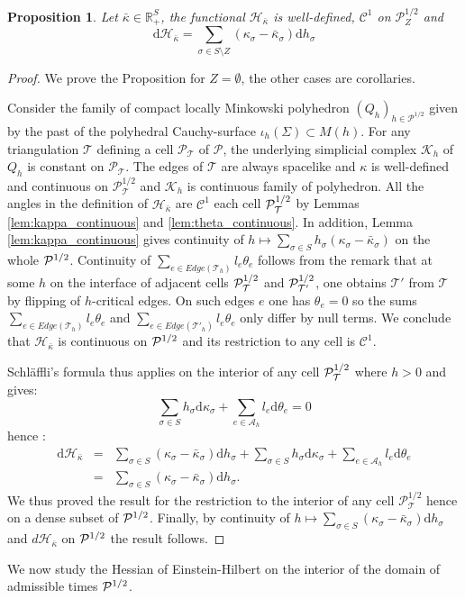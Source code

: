 \documentclass[a4paper,12pt]{article}
\def\A{\mathcal A}
\def\TT{\mathcal T}
\def\adm{\P}
\def\d{\mathrm{d}}
\def\RR{\mathbb{R}}
\def\d{\mathrm{d}}
\def\adm{\mathcal{P}}
\def\P{\mathcal{P}}
\def\A{\mathcal A}
\newtheorem{prop}[lem]{Proposition}
\theoremstyle{definition}
\begin{document}
                    
					\begin{prop} \label{prop:diff_H}
					Let $\bar\kappa \in \RR_+^{S}$, 
					the functional $\mathcal{H}_{\bar \kappa}$ is well-defined, $\mathscr C^1$ on $\adm^{1/2}_Z$ and
					$$\d \mathcal{H}_{\bar \kappa} = \sum_{\sigma \in S\setminus Z} (\kappa_\sigma-\bar\kappa_\sigma)\d h_\sigma$$
					\end{prop}
					\begin{proof}
					We prove the Proposition for $Z=\emptyset$, the other cases are corollaries.
					
					 Consider the family of compact locally Minkowski polyhedron
						$(Q_h)_{h\in \adm^{1/2}}$
					 given by the past of the polyhedral Cauchy-surface $\iota_h(\Sigma)\subset M(h)$. 
					 For any triangulation $\TT$ defining a cell $\adm_{\TT}$ of $\adm$, the underlying simplicial complex $\mathcal K_h$ of $Q_h$ is constant on $\adm_{\TT}$. The edges of $\TT$ are always spacelike and $\kappa$ is well-defined and continuous on $\adm_\TT^{1/2}$ and $\mathcal K_h$ is continuous family of polyhedron. 
					 All the angles in the definition of $\mathcal H_{\bar\kappa}$ are $\mathscr C^1$ each cell $\Psq_\TT$ by Lemmas \ref{lem:kappa_continuous} and \ref{lem:theta_continuous}.
					 In addition, Lemma \ref{lem:kappa_continuous} gives continuity of $h\mapsto \sum_{\sigma\in S} h_\sigma (\kappa_\sigma-\bar\kappa_\sigma)$ on the whole $\Psq$. 
					 Continuity of $\sum_{e\in Edge(\TT_h)} l_e\theta_e$ follows from the remark that at some $h$ on the interface of adjacent cells $\PsqTT$ and $\Psq_{\TT'}$, one obtains $\TT'$ from $\TT$ by flipping of $h$-critical edges. On such edges $e$ one has $\theta_e=0$ so the sums  $\sum_{e\in Edge(\TT_h)} l_e\theta_e$ and $\sum_{e\in Edge(\TT'_h)} l_e\theta_e$ only differ by null terms. We conclude that $\mathcal{H}_{\bar \kappa}$ 
					 is continuous on $\Psq$ and its restriction to any cell is $\mathscr C^1$. 
					 
					 Schläffli's formula thus applies on the interior of any cell $\PsqTT$ where $h>0$ and gives:
					 $$\sum_{\sigma\in S} h_\sigma \d \kappa_\sigma + \sum_{e\in \A_h} l_e \d\theta_e = 0$$
					 hence :
					 \begin{eqnarray*}
					 \d \mathcal{H}_{\bar\kappa} &= & \sum_{\sigma \in S} (\kappa_\sigma-\bar\kappa_\sigma) \d h_\sigma +\sum_{\sigma\in S} h_\sigma \d \kappa_\sigma + \sum_{e\in \A_h} l_e \d \theta_e\\
					 &=& \sum_{\sigma \in S} (\kappa_\sigma-\bar\kappa_\sigma) \d h_\sigma.
					 \end{eqnarray*}   
					 We thus proved the result for the restriction to the interior of any cell $\P_\TT^{1/2}$ hence on a dense subset of $\Psq$.
					  Finally, by continuity of $h\mapsto \sum_{\sigma \in S} (\kappa_\sigma-\bar\kappa_\sigma) \d h_\sigma $ and  $d\mathcal H_{\bar\kappa}$ on $\Psq$ the result follows.
					\end{proof}
		We now study the Hessian of Einstein-Hilbert on the interior of the domain of admissible times $\Psq$. 
					
\end{document}
